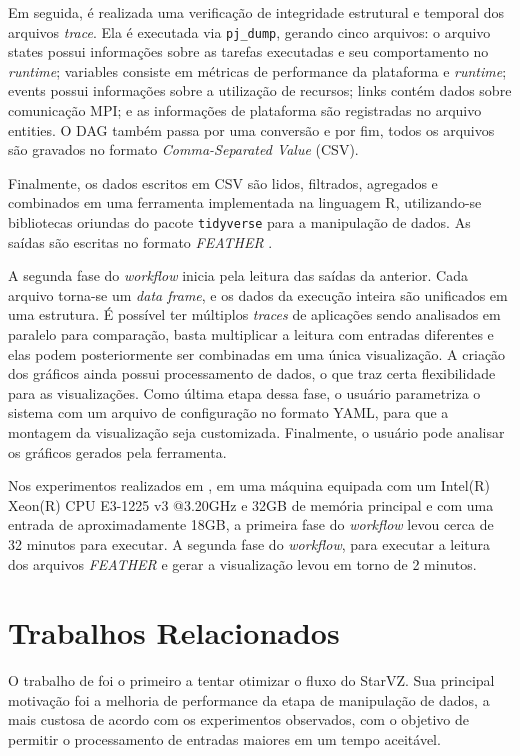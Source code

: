 Em seguida, é realizada uma verificação de integridade estrutural e temporal dos
arquivos \emph{trace}. Ela é executada via \texttt{pj\_dump}, gerando cinco 
arquivos: o arquivo states possui informações sobre as tarefas executadas e seu comportamento no 
\emph{runtime}; variables consiste em métricas de performance da plataforma e \emph{runtime}; events 
possui informações sobre a utilização de recursos; links contém dados sobre comunicação MPI; e as 
informações de plataforma são registradas no arquivo entities. O DAG também passa por uma conversão e por 
fim, todos os arquivos são gravados no formato \emph{Comma-Separated Value} (CSV).

Finalmente, os dados escritos em CSV são lidos, filtrados, agregados e 
combinados em uma ferramenta implementada na linguagem R, utilizando-se bibliotecas oriundas 
do pacote \texttt{tidyverse} para a manipulação de dados. As saídas são escritas no 
formato \emph{FEATHER} \cite{ref:feather}.

A segunda fase do \emph{workflow} inicia pela leitura das saídas da anterior. 
Cada arquivo torna-se um \emph{data frame}, e os dados da execução inteira são unificados em 
uma estrutura. É possível ter múltiplos \emph{traces} de aplicações sendo analisados em 
paralelo para comparação, basta multiplicar a leitura com entradas diferentes e 
elas podem posteriormente ser combinadas em uma única visualização. A criação 
dos gráficos ainda possui processamento de dados, o que traz certa flexibilidade para as 
visualizações. Como última etapa dessa fase, o usuário parametriza o sistema com um arquivo de configuração no formato YAML, para que 
a montagem da visualização seja customizada. Finalmente, o usuário pode analisar 
os gráficos gerados pela ferramenta.

Nos experimentos realizados em \citet{ref:starvz}, em uma máquina equipada com 
um Intel(R) Xeon(R) CPU E3-1225 v3 @3.20GHz e 32GB de memória principal e com uma entrada de aproximadamente 18GB, a primeira fase do \emph{workflow} levou cerca de 32 minutos para executar. A segunda fase do \emph{workflow}, para executar a leitura dos 
arquivos \emph{FEATHER} e gerar a visualização levou em torno de 2 minutos.

\section{Trabalhos Relacionados}\label{sect:related-work}

O trabalho de \citet{ref:drakestarvz} foi o primeiro a tentar otimizar o fluxo 
do StarVZ. Sua principal motivação foi a melhoria de performance da etapa de manipulação 
de dados, a mais custosa de acordo com os experimentos observados, com o objetivo de permitir o 
processamento de entradas maiores em um tempo aceitável.


